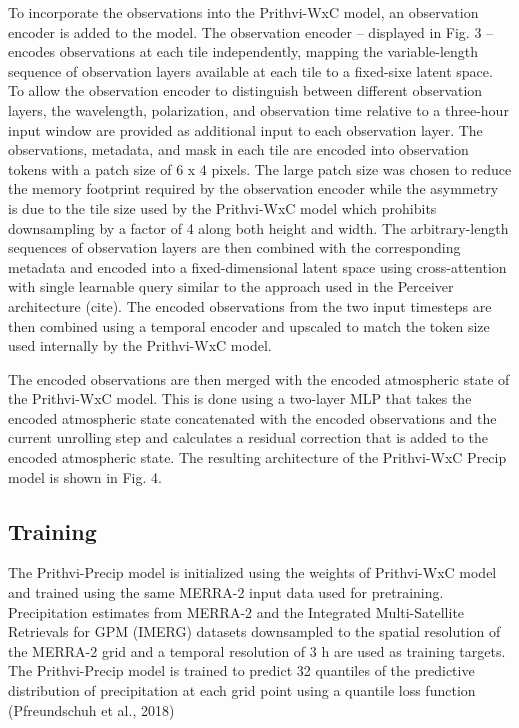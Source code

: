 \documentclass{ametsocV6.1}
\begin{document}
To incorporate the observations into the Prithvi-WxC model, an observation
encoder is added to the model. The observation encoder -- displayed in Fig. 3 --
encodes observations at each tile independently, mapping the variable-length
sequence of observation layers available at each tile to a fixed-sixe latent
space. To allow the observation encoder to distinguish between different
observation layers, the wavelength, polarization, and observation time relative
to a three-hour input window are provided as additional input to each
observation layer. The observations, metadata, and mask in each tile are encoded
into observation tokens with a patch size of 6 x 4 pixels. The large patch size
was chosen to reduce the memory footprint required by the observation encoder
while the asymmetry is due to the tile size used by the Prithvi-WxC model which
prohibits downsampling by a factor of 4 along both height and width. The
arbitrary-length sequences of observation layers are then combined with the
corresponding metadata and encoded into a fixed-dimensional latent space using
cross-attention with single learnable query similar to the approach used in the
Perceiver architecture (cite). The encoded observations from the two input
timesteps are then combined using a temporal encoder and upscaled to match the
token size used internally by the Prithvi-WxC model.

The encoded observations are then merged with the encoded atmospheric state of
the Prithvi-WxC model. This is done using a two-layer MLP that takes the encoded
atmospheric state concatenated with the encoded observations and the current
unrolling step and calculates a residual correction that is added to the encoded
atmospheric state. The resulting architecture of the Prithvi-WxC Precip model is
shown in Fig. 4.

\subsection{Training}

The Prithvi-Precip model is initialized using the weights of Prithvi-WxC model
and trained using the same MERRA-2 input data used for pretraining.
Precipitation estimates from MERRA-2 and the Integrated Multi-Satellite
Retrievals for GPM (IMERG) datasets downsampled to the spatial resolution of the
MERRA-2 grid and a temporal resolution of 3 h are used as training targets. The
Prithvi-Precip model is trained to predict 32 quantiles of the predictive
distribution of precipitation at each grid point using a quantile loss function
(Pfreundschuh et al., 2018)
\end{document}
